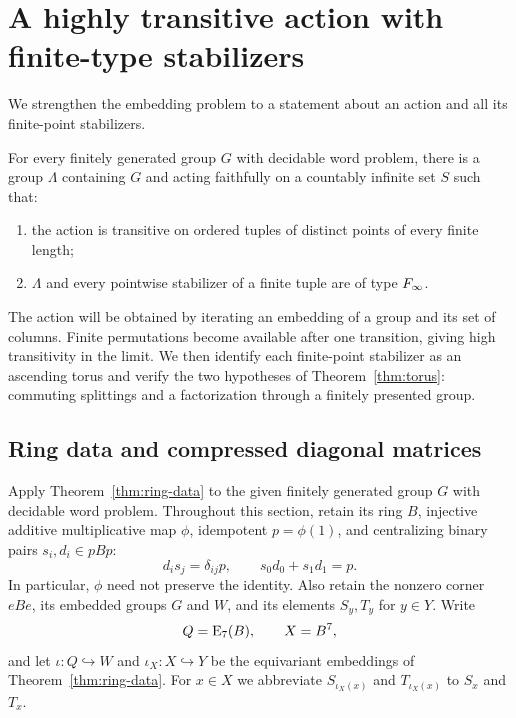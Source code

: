 \section{A highly transitive action with finite-type stabilizers}
\label{sec:stage}

We strengthen the embedding problem to a statement about an action and
all its finite-point stabilizers.

\begin{theorem}\label{thm:action}
For every finitely generated group $G$ with decidable word problem,
there is a group $\Lambda$ containing $G$ and acting faithfully on a
countably infinite set $S$ such that:
\begin{enumerate}[label=\textup{(\roman*)}]
 \item the action is transitive on ordered tuples of distinct points
 of every finite length;
 \item $\Lambda$ and every pointwise stabilizer of a finite tuple
 are of type $F_\infty$.
\end{enumerate}
\end{theorem}

The action will be obtained by iterating an embedding of a group and its
set of columns.  Finite permutations become available after one
transition, giving high transitivity in the limit.  We then identify each
finite-point stabilizer as an ascending torus and verify the two
hypotheses of Theorem~\ref{thm:torus}: commuting splittings and a
factorization through a finitely presented group.

\subsection{Ring data and compressed diagonal matrices}

Apply Theorem~\ref{thm:ring-data} to the given finitely generated group
$G$ with decidable word problem.  Throughout this section, retain its
ring $B$, injective additive multiplicative map $\phi$, idempotent
$p=\phi(1)$, and centralizing binary pairs $s_i,d_i\in pBp$:
\begin{equation}\label{eq:stage-binary}
 d_i s_j=\delta_{ij}p,
 \qquad s_0d_0+s_1d_1=p.
\end{equation}
In particular, $\phi$ need not preserve the identity.  Also retain the
nonzero corner $eBe$, its embedded groups $G$ and $W$, and its elements
$S_y,T_y$ for $y\in Y$.  Write
\[
 Q=\mathrm E_7(B),\qquad X=B^7,
\]
and let
$\iota:Q\hookrightarrow W$ and $\iota_X:X\hookrightarrow Y$
be the equivariant embeddings of Theorem~\ref{thm:ring-data}.
For $x\in X$ we abbreviate
$S_{\iota_X(x)}$ and $T_{\iota_X(x)}$ to $S_x$ and $T_x$.

